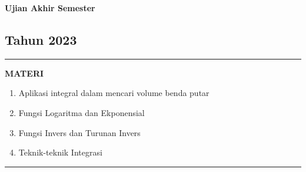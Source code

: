 \begin{flushright}
    \textbf{\Large{Ujian Akhir Semester}}
    \subsection*{Tahun 2023}
\end{flushright}


\vspace{0.5cm}\hrule height 2pt\vspace{0.5cm}


\begin{center}
\textbf{\large{MATERI}}
\begin{enumerate}[leftmargin=*, label={\arabic*}.]
\item Aplikasi integral dalam mencari volume benda putar
\item Fungsi Logaritma dan Ekponensial
\item Fungsi Invers dan Turunan Invers
\item Teknik-teknik Integrasi
\end{enumerate}
\end{center}


\vspace{0.2cm}\hrule height 1pt\vspace{0.5cm}


